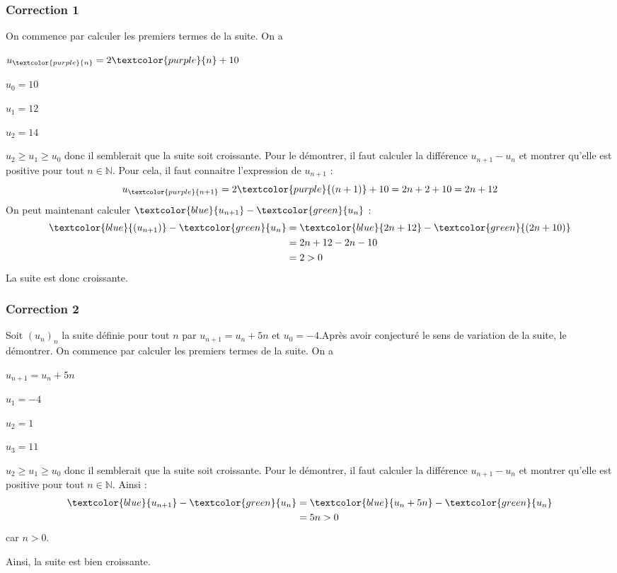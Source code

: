 \documentclass[15pt, mathserif]{beamer}
\newcommand{\N}{\mathbb{N}}			%
\begin{document}
\begin{frame}
\vspace{-10mm}
	\frametitle{Correction 1}
 \vspace*{1cm} 
 On commence par calculer les premiers termes de la suite. On a 
 \begin{multicols}{4} 
 $u_{\textcolor{purple}{n}}=2\textcolor{purple}{n}+10$ 
 
  \columnbreak 
 
  $u_0=10$ 
 
  \columnbreak 
 
 $u_1=12$ 
 
 \columnbreak 
 
 $u_2=14$ 
  \end{multicols} $u_2 \geqslant u_1 \geqslant u_0$ donc il semblerait que la suite soit croissante. Pour le démontrer, il faut calculer la différence $u_{n+1} -u_n$ et montrer qu'elle est positive pour tout $n \in \N$. Pour cela, il faut connaitre l'expression de $u_{n+1}$ : $$u_{\textcolor{purple}{n+1}} = 2\textcolor{purple}{(n+1)}+10=2n+2+10=2n+12$$ On peut maintenant calculer $\textcolor{blue}{u_{n+1}}-\textcolor{green}{u_n} $ : \begin{align*} \textcolor{blue}{(u_{n+1})}-\textcolor{green}{u_n} &=\textcolor{blue}{2n+12}-\textcolor{green}{(2n+10)} \\ 
 &= 2n+12-2n-10\\ 
 &= 2 >0 
 \end{align*} 
 La suite est donc croissante. \end{frame}


\begin{frame}
\vspace{-10mm}
	\frametitle{Correction 2}
\bigskip 
 Soit $(u_n)_n$ la suite définie pour tout $n$ par $u_{n+1}=u_n+5n$ et $u_0=-4$.Après avoir conjecturé le sens de variation de la suite, le démontrer. On commence par calculer les premiers termes de la suite. On a 
 \begin{multicols}{4} 
 $u_{n+1}=u_n+5n$ 
 
  \columnbreak 
 
 $u_1=-4$ 
 
 \columnbreak 
 
 $u_2=1$ 
 
 \columnbreak 
 
 $u_3=11$ 
  \end{multicols} $u_2 \geqslant u_1 \geqslant u_0$ donc il semblerait que la suite soit croissante. Pour le démontrer, il faut calculer la différence $u_{n+1} -u_n$ et montrer qu'elle est positive pour tout $n \in \N$. Ainsi : \begin{align*} \textcolor{blue}{u_{n+1}}-\textcolor{green}{u_n} &=\textcolor{blue}{  u_n+5n}-\textcolor{green}{u_n} \\ 
 &=5n >0 
 \end{align*} car $n>0$. 
 
 Ainsi, la suite est bien croissante. \end{frame}
\end{document}
